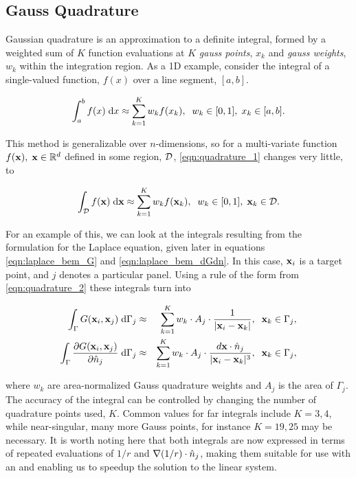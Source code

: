 \subsection{Gauss Quadrature}\label{subsubsec:quadrature}

Gaussian quadrature is an approximation to a definite integral, formed by a weighted sum of $K$ function evaluations at $K$ \emph{gauss points}, $x_k$ and \emph{gauss weights}, $w_k$ within the integration region. As a 1D example, consider the integral of a single-valued function, $f(x)$ over a line segment, $[a,b]$.

\begin{equation}
	\int_a^{b} f(x)\;\di{x} \approx \sum_{k=1}^{K} w_k f(x_k), \;\; w_k\in[0,1],\; x_k \in [a,b].
	\label{eqn:quadrature_1}
\end{equation}

This method is generalizable over $n$-dimensions, so for a multi-variate function $f(\mathbf{x}),\;\mathbf{x}\in\mathbb{R}^{d}$ defined in some region, $\mathcal{D}$, \ref{eqn:quadrature_1} changes very little, to

\begin{equation}
	\int_{\D} f(\vect{x})\;\di{\vect{x}} \approx \sum_{k=1}^{K} w_k f(\vect{x}_k), \;\; w_k\in[0,1],\; \vect{x}_k \in \D.
	\label{eqn:quadrature_2}
\end{equation}

For an example of this, we can look at the integrals resulting from the {\bem} formulation for the Laplace equation, given later in equations \ref{eqn:laplace_bem_G} and \ref{eqn:laplace_bem_dGdn}. In this case, $\mathbf{x}_i$ is a target point, and $j$ denotes a particular panel. Using a rule of the form from \ref{eqn:quadrature_2} these integrals turn into

\begin{eqnarray}
	\int_{\Gamma} G(\mathbf{x}_i,\mathbf{x}_j)\;\text{d}\Gamma_j & \approx & \sum_{k=1}^{K} w_k\cdot A_j\cdot \frac{1}{|\mathbf{x}_i-\mathbf{x}_k|},\;\;\mathbf{x}_k \in \Gamma_j, \\ 
	\int_{\Gamma} \frac{\partial G(\mathbf{x}_i,\mathbf{x}_j)}{\partial \hat{n}_j}\;\text{d}\Gamma_j & \approx & \sum_{k=1}^{K}w_k\cdot A_j\cdot \frac{d\mathbf{x}\cdot\hat{n}_j}{|\mathbf{x}_i-\mathbf{x}_k|^{3}},\;\;\mathbf{x}_k \in \Gamma_j,
\end{eqnarray}

\noindent
where $w_k$ are area-normalized Gauss quadrature weights and $A_j$ is the area of $\Gamma_j$. The accuracy of the integral can be controlled by changing the number of quadrature points used, $K$. Common values for far integrals include $K=3,4$, while near-singular, many more Gauss points, for instance $K=19, 25$ may be necessary. It is worth noting here that both integrals are now expressed in terms of repeated evaluations of $1/r$ and $\nabla (1 / r)\cdot\hat{n}_j$, making them suitable for use with an {\fmm} and enabling us to speedup the solution to the linear system. %

